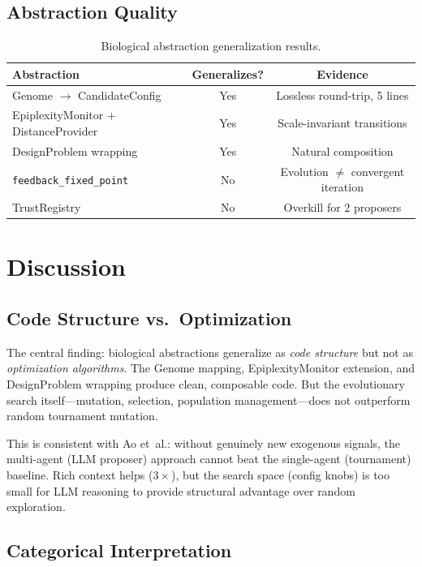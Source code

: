 \documentclass[11pt]{article}
\begin{document}
\subsection{Abstraction Quality}

\begin{table}[h]
\centering
\begin{tabular}{lcc}
\toprule
\textbf{Abstraction} & \textbf{Generalizes?} & \textbf{Evidence} \\
\midrule
Genome $\rightarrow$ CandidateConfig & Yes & Lossless round-trip, 5 lines \\
EpiplexityMonitor + DistanceProvider & Yes & Scale-invariant transitions \\
DesignProblem wrapping & Yes & Natural composition \\
\texttt{feedback\_fixed\_point} & No & Evolution $\neq$ convergent iteration \\
TrustRegistry & No & Overkill for 2 proposers \\
\bottomrule
\end{tabular}
\caption{Biological abstraction generalization results.}
\end{table}

\section{Discussion}

\subsection{Code Structure vs.\ Optimization}

The central finding: biological abstractions generalize as \emph{code
structure} but not as \emph{optimization algorithms}. The Genome mapping,
EpiplexityMonitor extension, and DesignProblem wrapping produce clean,
composable code. But the evolutionary search itself---mutation, selection,
population management---does not outperform random tournament mutation.

This is consistent with Ao et~al.: without genuinely new exogenous
signals, the multi-agent (LLM proposer) approach cannot beat the
single-agent (tournament) baseline. Rich context helps ($3\times$), but
the search space (config knobs) is too small for LLM reasoning to
provide structural advantage over random exploration.

\subsection{Categorical Interpretation}
\end{document}
